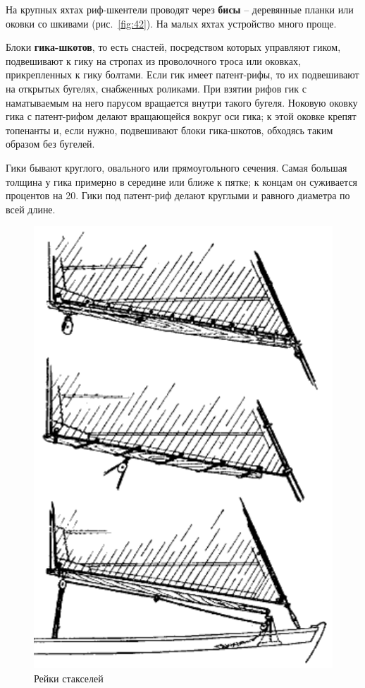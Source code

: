 \documentclass[a4paper, 12pt, twoside, final]{scrbook}
\begin{document}
На крупных яхтах риф-шкентели проводят через \textbf{бисы} \--- деревянные
планки или оковки со шкивами (рис.~\ref{fig:42}).
На малых яхтах устройство много проще.

Блоки \textbf{гика-шкотов}, то есть снастей, посредством которых управляют
гиком, подвешивают к гику на стропах из проволочного троса или оковках,
прикрепленных к гику болтами. Если гик имеет патент-рифы, то их подвешивают
на открытых бугелях, снабженных роликами. При взятии рифов гик с наматываемым
на него парусом вращается внутри такого бугеля. Ноковую оковку гика
с патент-рифом делают вращающейся вокруг оси гика; к этой оковке крепят
топенанты и, если нужно, подвешивают блоки гика-шкотов, обходясь таким
образом без бугелей.

Гики бывают круглого, овального или прямоугольного сечения. Самая
большая толщина у гика примерно в середине или ближе к пятке; к концам
он суживается процентов на 20. Гики под патент-риф делают круглыми
и равного диаметра по всей длине.

\begin{figure}%
\begin{centering}
\includegraphics{Rejki_stakselej}
\par\end{centering}

\protect\caption{\label{fig:43}Рейки стакселей}


\end{figure}%
\end{document}
